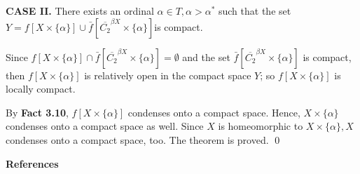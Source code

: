 \documentclass{article}
\begin{document}
																																																				\vskip 30pt

																																																				\textbf{CASE II.} There exists an ordinal $\alpha \in T, \alpha>\alpha^*$ such that the set $Y=f\left[X\times\{\alpha\}\right] \cup \bar{f}\left[\overline{C_2}^{\beta X} \times \{\alpha\}\right] $is compact. 

																																																				\vskip 10pt

																																																				Since $f\left[X\times\{\alpha\}\right] \cap \bar{f}\left[\overline{C_2}^{\beta X} \times \{\alpha\}\right]=\emptyset$ and the set 
																																																				$\bar{f}\left[\overline{C_2}^{\beta X} \times \{\alpha\}\right]$ is compact, then $f\left[X\times \{\alpha\}\right]$ is relatively open in the compact space $Y$; so  $f\left[X\times\{\alpha\}\right]$ is locally compact.
																																																				\vskip 10pt

																																																				By \textbf{Fact 3.10}, $f\left[X\times\{\alpha\}\right]$ condenses onto a compact space. Hence, $X\times\{\alpha\}$ condenses onto a compact space as well. Since $X$ is homeomorphic to $X\times \{\alpha\}, X$ condenses onto a compact space, too. The theorem is proved. \qed



																																																				\newpage


																																																				\begin{center}
																																																				\textbf{References}
																																																				\end{center}

																																																				\vskip 30pt
\end{document}
